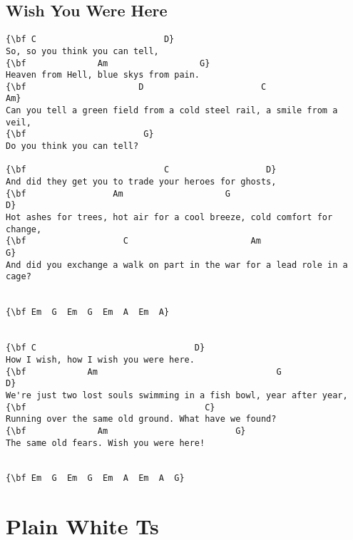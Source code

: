 \documentclass[a4paper]{article}
\begin{document}
\subsection{Wish You Were Here} %
\label{sub:Wish You Were Here}
\begin{Verbatim}[commandchars=\\\{\}]
{\bf C                         D}
So, so you think you can tell,
{\bf              Am                  G}
Heaven from Hell, blue skys from pain.
{\bf                      D                       C                    Am}
Can you tell a green field from a cold steel rail, a smile from a veil,
{\bf                       G}
Do you think you can tell?

{\bf                           C                   D}
And did they get you to trade your heroes for ghosts,
{\bf                 Am                    G                             D}
Hot ashes for trees, hot air for a cool breeze, cold comfort for change,
{\bf                   C                        Am                         G}
And did you exchange a walk on part in the war for a lead role in a cage?


{\bf Em  G  Em  G  Em  A  Em  A}


{\bf C                               D}
How I wish, how I wish you were here.
{\bf            Am                                   G                    D}
We're just two lost souls swimming in a fish bowl, year after year,
{\bf                                   C}
Running over the same old ground. What have we found?
{\bf              Am                         G}
The same old fears. Wish you were here!


{\bf Em  G  Em  G  Em  A  Em  A  G}
\end{Verbatim}
\newpage

\section{Plain White Ts} %
\label{sec:Plain White Ts}
\end{document}
